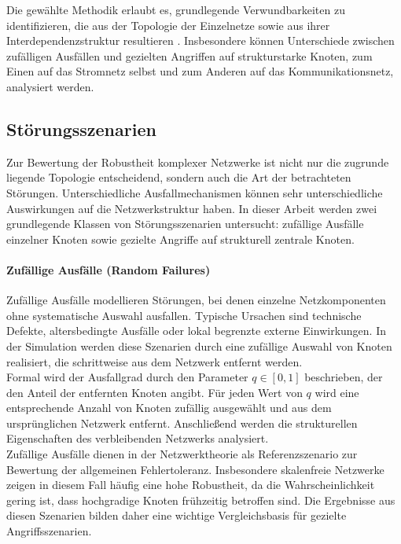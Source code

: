 Die gewählte Methodik erlaubt es, grundlegende Verwundbarkeiten zu identifizieren, die aus der Topologie der Einzelnetze sowie aus ihrer Interdependenzstruktur resultieren \cite[vgl.][1025]{Buldyrev2010Interdependent}. Insbesondere können Unterschiede zwischen zufälligen Ausfällen und gezielten Angriffen auf strukturstarke Knoten, zum Einen auf das Stromnetz selbst und zum Anderen auf das Kommunikationsnetz, analysiert werden. 

\subsection{Störungsszenarien}

Zur Bewertung der Robustheit komplexer Netzwerke ist nicht
nur die zugrunde liegende Topologie entscheidend, sondern auch die Art der
betrachteten Störungen. Unterschiedliche Ausfallmechanismen können sehr
unterschiedliche Auswirkungen auf die Netzwerkstruktur haben. In dieser Arbeit
werden zwei grundlegende Klassen von Störungsszenarien untersucht: zufällige
Ausfälle einzelner Knoten sowie gezielte Angriffe auf strukturell zentrale
Knoten.

\paragraph{Zufällige Ausfälle (Random Failures)}
Zufällige Ausfälle modellieren Störungen, bei denen einzelne Netzkomponenten
ohne systematische Auswahl ausfallen. Typische Ursachen sind technische
Defekte, altersbedingte Ausfälle oder lokal begrenzte externe Einwirkungen. In
der Simulation werden diese Szenarien durch eine zufällige Auswahl von Knoten
realisiert, die schrittweise aus dem Netzwerk entfernt werden.\\
Formal wird der Ausfallgrad durch den Parameter $q \in [0,1]$ beschrieben, der
den Anteil der entfernten Knoten angibt. Für jeden Wert von $q$ wird eine
entsprechende Anzahl von Knoten zufällig ausgewählt und aus dem ursprünglichen
Netzwerk entfernt. Anschließend werden die strukturellen Eigenschaften des
verbleibenden Netzwerks analysiert.\\
Zufällige Ausfälle dienen in der Netzwerktheorie als Referenzszenario zur
Bewertung der allgemeinen Fehlertoleranz. Insbesondere skalenfreie Netzwerke
zeigen in diesem Fall häufig eine hohe Robustheit, da die Wahrscheinlichkeit
gering ist, dass hochgradige Knoten frühzeitig betroffen sind. Die Ergebnisse aus diesen Szenarien bilden daher eine
wichtige Vergleichsbasis für gezielte Angriffsszenarien.

